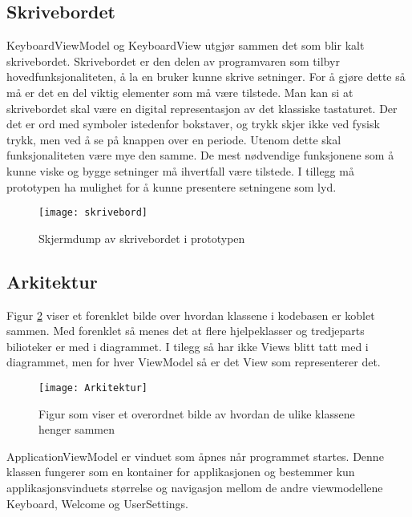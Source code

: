 { 

 
 \subsection{Skrivebordet}
 
KeyboardViewModel og KeyboardView utgjør sammen det som blir kalt skrivebordet. Skrivebordet er den delen av programvaren som tilbyr hovedfunksjonaliteten, å la en bruker kunne skrive setninger. For å gjøre dette så må er det en del viktig elementer som må være tilstede. Man kan si at skrivebordet skal være en digital representasjon av det klassiske tastaturet. Der det er ord med symboler istedenfor bokstaver, og trykk skjer ikke ved fysisk trykk, men ved å se på knappen over en periode. Utenom dette skal funksjonaliteten være mye den samme. De mest nødvendige funksjonene som å kunne viske og bygge setninger må ihvertfall være tilstede. I tillegg må prototypen ha mulighet for å kunne presentere setningene som lyd. 

\begin{figure}[ht!] 
\centering 
\texttt{[image: skrivebord]} 
\caption{Skjermdump av skrivebordet i prototypen} 
\label{fig:skrivebord} 
\end{figure} 
 


\subsection{Arkitektur} 
 
 
Figur \ref{fig:arkitektur} viser et forenklet bilde over hvordan klassene i kodebasen er koblet sammen. Med forenklet så menes det at flere hjelpeklasser og tredjeparts bilioteker er med i diagrammet. I tilegg så har ikke Views blitt tatt med i diagrammet, men for hver ViewModel så er det View som representerer det.  
 

\begin{figure}[ht] 
\centering 
\texttt{[image: Arkitektur]} 
\caption{Figur som viser et overordnet bilde av hvordan de ulike klassene henger sammen} 
\label{fig:arkitektur} 
\end{figure} 
 

ApplicationViewModel er vinduet som åpnes når programmet startes. Denne klassen fungerer som en kontainer for applikasjonen og bestemmer kun applikasjonsvinduets størrelse og navigasjon mellom de andre viewmodellene Keyboard, Welcome og UserSettings.  
 
 

}
